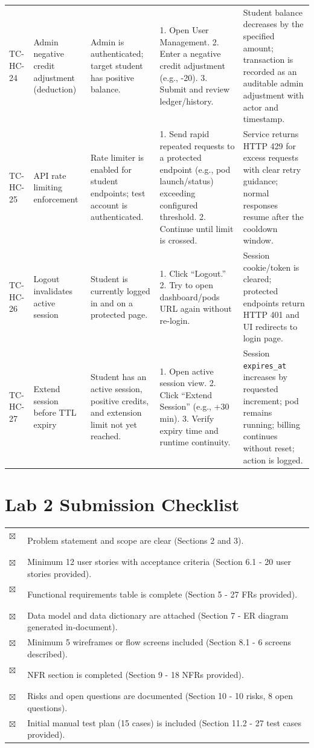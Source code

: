 \documentclass[12pt,a4paper]{article}
\newcommand{\cboxd}{\(\boxtimes\)\ }
\begin{document}
\begin{longtable}{@{}L{2cm}L{3cm}L{3cm}L{3.5cm}L{3cm}@{}}
    TC-HC-24 & Admin negative credit adjustment (deduction) & Admin is authenticated; target student has positive balance. & 1. Open User Management. 2. Enter a negative credit adjustment (e.g., -20). 3. Submit and review ledger/history. & Student balance decreases by the specified amount; transaction is recorded as an auditable admin adjustment with actor and timestamp. \\
  TC-HC-25 & API rate limiting enforcement & Rate limiter is enabled for student endpoints; test account is authenticated. & 1. Send rapid repeated requests to a protected endpoint (e.g., pod launch/status) exceeding configured threshold. 2. Continue until limit is crossed. & Service returns HTTP 429 for excess requests with clear retry guidance; normal responses resume after the cooldown window. \\
    TC-HC-26 & Logout invalidates active session & Student is currently logged in and on a protected page. & 1. Click ``Logout.'' 2. Try to open dashboard/pods URL again without re-login. & Session cookie/token is cleared; protected endpoints return HTTP 401 and UI redirects to login page. \\
  TC-HC-27 & Extend session before TTL expiry & Student has an active session, positive credits, and extension limit not yet reached. & 1. Open active session view. 2. Click ``Extend Session'' (e.g., +30 min). 3. Verify expiry time and runtime continuity. & Session \texttt{expires\_at} increases by requested increment; pod remains running; billing continues without reset; action is logged. \\
\end{longtable}

\newpage
\section{Lab 2 Submission Checklist}

\begin{tabularx}{\textwidth}{@{}C{0.5cm}X@{}}
  \cboxd & Problem statement and scope are clear (Sections 2 and 3). \\
    \cboxd & Minimum 12 user stories with acceptance criteria (Section 6.1 - 20 user stories provided). \\
  \cboxd & Functional requirements table is complete (Section 5 - 27 FRs provided). \\
    \cboxd & Data model and data dictionary are attached (Section 7 - ER diagram generated in-document). \\
  \cboxd & Minimum 5 wireframes or flow screens included (Section 8.1 - 6 screens described). \\
    \cboxd & NFR section is completed (Section 9 - 18 NFRs provided). \\
  \cboxd & Risks and open questions are documented (Section 10 - 10 risks, 8 open questions). \\
    \cboxd & Initial manual test plan (15 cases) is included (Section 11.2 - 27 test cases provided). \\
  
\end{tabularx}
\end{document}

